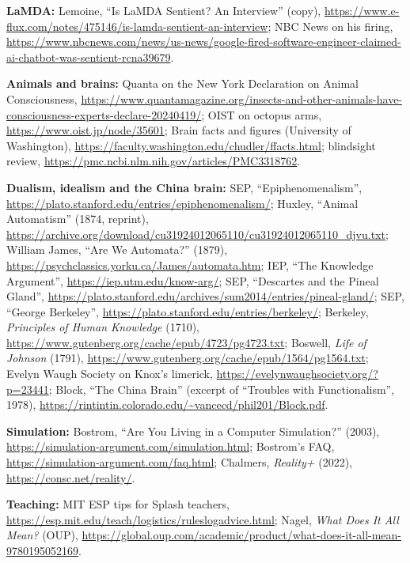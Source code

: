 \documentclass[11pt,letterpaper]{article}
\begin{document}
{\textsf{\bfseries LaMDA:}
Lemoine, ``Is LaMDA Sentient? An Interview'' (copy), \url{https://www.e-flux.com/notes/475146/is-lamda-sentient-an-interview};
NBC News on his firing, \url{https://www.nbcnews.com/news/us-news/google-fired-software-engineer-claimed-ai-chatbot-was-sentient-rcna39679}.

\textsf{\bfseries Animals and brains:}
Quanta on the New York Declaration on Animal Consciousness, \url{https://www.quantamagazine.org/insects-and-other-animals-have-consciousness-experts-declare-20240419/};
OIST on octopus arms, \url{https://www.oist.jp/node/35601};
Brain facts and figures (University of Washington), \url{https://faculty.washington.edu/chudler/ffacts.html};
blindsight review, \url{https://pmc.ncbi.nlm.nih.gov/articles/PMC3318762}.

\textsf{\bfseries Dualism, idealism and the China brain:}
SEP, ``Epiphenomenalism'', \url{https://plato.stanford.edu/entries/epiphenomenalism/};
Huxley, ``Animal Automatism'' (1874, reprint), \url{https://archive.org/download/cu31924012065110/cu31924012065110_djvu.txt};
William James, ``Are We Automata?'' (1879), \url{https://psychclassics.yorku.ca/James/automata.htm};
IEP, ``The Knowledge Argument'', \url{https://iep.utm.edu/know-arg/};
SEP, ``Descartes and the Pineal Gland'', \url{https://plato.stanford.edu/archives/sum2014/entries/pineal-gland/};
SEP, ``George Berkeley'', \url{https://plato.stanford.edu/entries/berkeley/};
Berkeley, \emph{Principles of Human Knowledge} (1710), \url{https://www.gutenberg.org/cache/epub/4723/pg4723.txt};
Boswell, \emph{Life of Johnson} (1791), \url{https://www.gutenberg.org/cache/epub/1564/pg1564.txt};
Evelyn Waugh Society on Knox's limerick, \url{https://evelynwaughsociety.org/?p=23441};
Block, ``The China Brain'' (excerpt of ``Troubles with Functionalism'', 1978), \url{https://rintintin.colorado.edu/~vancecd/phil201/Block.pdf}.

\textsf{\bfseries Simulation:}
Bostrom, ``Are You Living in a Computer Simulation?'' (2003), \url{https://simulation-argument.com/simulation.html};
Bostrom's FAQ, \url{https://simulation-argument.com/faq.html};
Chalmers, \emph{Reality+} (2022), \url{https://consc.net/reality/}.

\textsf{\bfseries Teaching:}
MIT ESP tips for Splash teachers, \url{https://esp.mit.edu/teach/logistics/ruleslogadvice.html};
Nagel, \emph{What Does It All Mean?} (OUP), \url{https://global.oup.com/academic/product/what-does-it-all-mean-9780195052169}.
\par}
\end{document}
